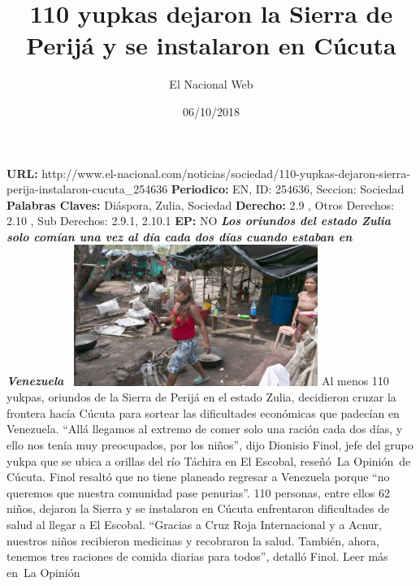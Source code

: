 \documentclass{article}%
\title{\textbf{110 yupkas dejaron la Sierra de Perijá y se instalaron en Cúcuta}}%
\author{El Nacional Web}%
\date{06/10/2018}%
\begin{document}
%
\normalsize%
\maketitle%
\textbf{URL: }%
http://www.el{-}nacional.com/noticias/sociedad/110{-}yupkas{-}dejaron{-}sierra{-}perija{-}instalaron{-}cucuta\_254636\newline%
%
\textbf{Periodico: }%
EN, %
ID: %
254636, %
Seccion: %
Sociedad\newline%
%
\textbf{Palabras Claves: }%
Diáspora, Zulia, Sociedad\newline%
%
\textbf{Derecho: }%
2.9%
, Otros Derechos: %
2.10%
, Sub Derechos: %
2.9.1, 2.10.1%
\newline%
%
\textbf{EP: }%
NO\newline%
\newline%
%
\textbf{\textit{Los oriundos del estado Zulia solo comían una vez al día cada dos días cuando estaban en Venezuela~}}%
\newline%
\newline%
%
\includegraphics[width=300px]{61.jpg}%
\newline%
%
Al menos 110 yukpas, oriundos de la Sierra de Perijá en el estado Zulia, decidieron cruzar la frontera hacía Cúcuta para sortear las dificultades económicas que padecían en Venezuela.%
\newline%
%
“Allá llegamos al extremo de comer solo una ración cada dos días, y ello nos tenía muy preocupados, por los niños”, dijo Dionisio Finol, jefe del grupo yukpa que se ubica a orillas del río Táchira en El Escobal, reseñó~La Opinión~de Cúcuta.%
\newline%
%
Finol resaltó que no tiene planeado regresar a Venezuela porque “no queremos que nuestra comunidad pase penurias”.%
\newline%
%
110 personas, entre ellos 62 niños, dejaron la Sierra y se instalaron en Cúcuta enfrentaron dificultades de salud al llegar a El Escobal.%
\newline%
%
“Gracias a Cruz Roja Internacional y a Acnur, nuestros niños recibieron medicinas y recobraron la salud. También, ahora, tenemos tres raciones de comida diarias para todos”, detalló Finol.%
\newline%
%
Leer más en~La Opinión%
\newline%
%
\end{document}
